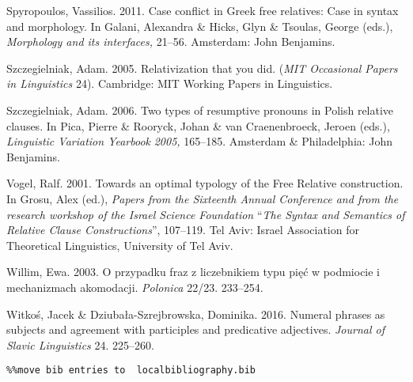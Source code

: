 \documentclass[output=paper]{langsci/langscibook}
\begin{document}
Spyropoulos, Vassilios. 2011. Case conflict in Greek free relatives: Case in syntax and morphology. In Galani, Alexandra \& Hicks, Glyn \& Tsoulas, George (eds.), \textit{Morphology and its interfaces,} 21–56. Amsterdam: John Benjamins. 

Szczegielniak, Adam. 2005. Relativization that you did. (\textit{MIT Occasional Papers in Linguistics} 24). Cambridge: MIT Working Papers in Linguistics. 

Szczegielniak, Adam. 2006. Two types of resumptive pronouns in Polish relative clauses. In Pica, Pierre \& Rooryck, Johan \& van Craenenbroeck, Jeroen (eds.), \textit{Linguistic Variation Yearbook} \textit{2005,} 165–185. Amsterdam \& Philadelphia: John Benjamins. 

Vogel, Ralf. 2001. Towards an optimal typology of the Free Relative construction. In Grosu, Alex (ed.), \textit{Papers from the Sixteenth Annual Conference and from the research workshop of the Israel Science Foundation} “\textit{The Syntax and Semantics of Relative Clause Constructions}”, 107–119. Tel Aviv: Israel Association for Theoretical Linguistics, University of Tel Aviv.

Willim, Ewa. 2003. O przypadku fraz z liczebnikiem typu pięć w podmiocie i mechanizmach akomodacji. \textit{Polonica} 22/23. 233–254.

Witkoś, Jacek \& Dziubała-Szrejbrowska, Dominika. 2016. Numeral phrases as subjects and agreement with participles and predicative adjectives. \textit{Journal of Slavic Linguistics} 24. 225–260.


\begin{verbatim}%%move bib entries to  localbibliography.bib
\end{verbatim} 

\sloppy
\printbibliography[heading=subbibliography,notkeyword=this] 
\end{document}
